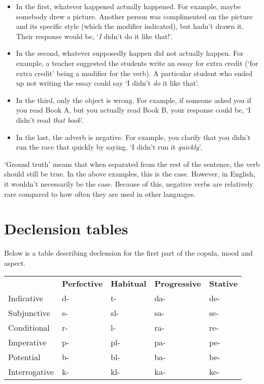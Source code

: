 \documentclass[12pt]{report}
\begin{document}
\begin{itemize}
\item In the first, whatever happened actually happened. For example, maybe somebody drew a picture. Another person was complimented on the picture and its specific style (which the modifier indicated), but hadn't drawn it. Their response would be, `\textit{I} didn't do it like that!'.
\item In the second, whatever supposedly happen did not actually happen. For example, a teacher suggested the students write an essay for extra credit (`for extra credit' being a modifier for the verb). A particular student who ended up not writing the essay could say `I didn't \textit{do} it like that'.
\item In the third, only the object is wrong. For example, if someone asked you if you read Book A, but you actually read Book B, your response could be, `I didn't read \textit{that book}'.
\item In the last, the adverb is negative. For example, you clarify that you didn't run the race that quickly by saying, `I didn't run it \textit{quickly}'.
\end{itemize}

`Ground truth' means that when separated from the rest of the sentence, the verb should still be true. In the above examples, this is the case. However, in English, it wouldn't necessarily be the case. Because of this, negative verbs are relatively rare compared to how often they are used in other languages.

\section{Declension tables}
Below is a table describing declension for the first part of the copula, mood and aspect.

\vspace{5mm}
\begin{tabular}{l | l | l | l | l}
  & \textbf{Perfective} &  \textbf{Habitual} & \textbf{Progressive} & \textbf{Stative}\\
Indicative & d- & t-& da-& de-  \\
Subjunctive  & s- &  sl- & sa- & se-  \\
Conditional &  r-& l- & ra- & re- \\
Imperative  & p- &  pl-& pa-& pe-  \\
Potential  & b-& bl-& ba- & be- \\
Interrogative & k- &  kl- & ka-&  ke-\\
\end{tabular}
\end{document}
